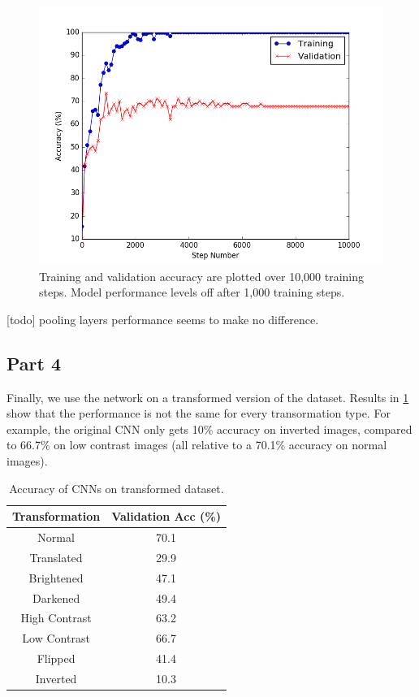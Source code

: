 \begin{figure}
	\centering
	\includegraphics [trim=0 0 0 0, clip, angle=0, width=0.8\columnwidth,
	keepaspectratio]{figures/2_3_num_steps}
	\caption{Training and validation accuracy are plotted over 10,000 training steps. Model performance levels off after 1,000 training steps.} 
	\label{fig:2_3_num_steps} 
\end{figure}

[todo] pooling layers performance seems to make no difference.

\subsection{Part 4}
Finally, we use the network on a transformed version of the dataset.
Results in \cref{table_2_4} show that the performance is not the same for every transormation type.
For example, the original CNN only gets 10\% accuracy on inverted images, compared to 66.7\% on low contrast images (all relative to a 70.1\% accuracy on normal images).

\begin{table}[ht!]
\centering
\begin{tabular}{||c c||}  
 \hline
 Transformation & Validation Acc (\%) \\ [0.3ex] 
 \hline\hline
 Normal & 70.1 \\ \hline
 Translated & 29.9 \\ \hline
 Brightened & 47.1 \\ \hline
 Darkened & 49.4 \\ \hline
 High Contrast & 63.2 \\ \hline
 Low Contrast & 66.7 \\ \hline
 Flipped & 41.4 \\ \hline
 Inverted & 10.3 \\ \hline
\end{tabular}
\caption{Accuracy of CNNs on transformed dataset.}
\label{table_2_4}
\end{table}



